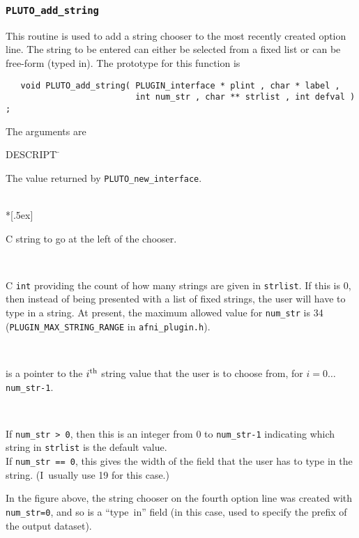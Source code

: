 \subsubsection{{\tt PLUTO\_add\_string}}
This routine is used to add a string chooser to the most recently created
option line.  The string to be entered can either be selected from a fixed
list or can be free-form (typed in).  The prototype for this function is
\begin{samepage}\begin{verbatim}
   void PLUTO_add_string( PLUGIN_interface * plint , char * label ,
                          int num_str , char ** strlist , int defval ) ;
\end{verbatim}\end{samepage}
\vset\noindent
The arguments are
\renewcommand{\tb}[1]{\parbox[t]{5.2in}{\sloppy #1}}
\begin{tabbing}
 \blob DESCRIPT \= \kill
%
  \> \tb{The value returned by {\tt PLUTO\_new\_interface}.} \\*[.5ex]
%
  \> \tb{C string to go at the left of the chooser.} \\[.5ex]
%
  \> \tb{C {\tt int} providing the count of how many strings are
                           given in {\tt strlist}.  If this is 0, then instead
                           of being presented with a list of fixed strings,
                           the user will have to type in a string. At present,
                           the maximum allowed value for {\tt num\_str} is 34
                           ({\tt PLUGIN\_MAX\_STRING\_RANGE} in {\tt afni\_plugin.h}).} \\[.5ex]
%
  \> \tb{{\tt strlist[i]} is a pointer to the $i^{\rm th}$ string value
                            that the user is to choose from, for $i=0\ldots${\tt num\_str-1}.}
                        \\[.5ex]
%
  \> \tb{If {\tt num\_str > 0}, then this is an integer from
                            0 to {\tt num\_str-1} indicating which string
                            in {\tt strlist} is the default value. \\
                          If {\tt num\_str == 0}, this gives the width of the
                          field that the user has to type in the string.
                          (I~usually use 19 for this case.)}
\end{tabbing}
In the figure above, the string chooser on the fourth option line was created
with {\tt num\_str=0}, and so is a ``type~in'' field (in this case, used to
specify the prefix of the output dataset).

